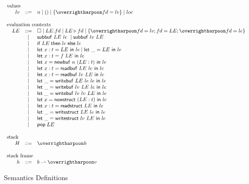\clearpage

\begin{figure}[!htbp]
  $$\begin{array}{rrcl}

    \multicolumn{4}{l}{\textrm{values}} \\
    & lv & ::= & n \mid () \mid \{\ls{fd=lv}\} \mid loc \\
    \\
    \multicolumn{4}{l}{\textrm{evaluation contexts}} \\
    & LE & ::= & \symhole \mid LE.fd \mid \estructfield{LE}{fd} \mid \{\ls{fd=lv};fd=LE;\ls{fd=le}\} \\
    & & \mid & \esubbuf{LE}{le} \mid \esubbuf{lv}{LE} \\
    & & \mid & \eif {LE}{le}{le} \\
    & & \mid & \elet{x:t}{LE}{le} \mid \elet{\_}{LE}{le} \\
    & & \mid & \elet{x:t}{f\;LE}{le} \\
    & & \mid & \elet{x}{\enewbuf{n}{(LE:t)}}{le} \\
    & & \mid & \elet{x:t}{\ereadbuf{LE}{le}}{le} \\
    & & \mid & \elet{x:t}{\ereadbuf{lv}{LE}}{le} \\
    & & \mid & \elet{\_}{\ewritebuf{LE}{le}{le}}{le} \\
    & & \mid & \elet{\_}{\ewritebuf{lv}{LE}{le}}{le} \\
    & & \mid & \elet{\_}{\ewritebuf{lv}{lv}{LE}}{le} \\
    & & \mid & \elet{x}{\enewstruct{(LE:t)}}{le} \\
    & & \mid & \elet{x:t}{\ereadstruct{LE}}{le} \\
    & & \mid & \elet{\_}{\ewritestruct{LE}{le}}{le} \\
    & & \mid & \elet{\_}{\ewritestruct{lv}{LE}}{le} \\
    & & \mid & \epop\;LE \\
    \\
    \multicolumn{4}{l}{\textrm{stack}} \\
    & H & ::= & \ls{h} \\
    \\
    \multicolumn{4}{l}{\textrm{stack frame}} \\
    & h & ::= & b\sympartial \ls{v} \\

\end{array}$$
\caption{\lamstar Semantics Definitions}
\label{fig:lowstar-semantics-defs}
\end{figure}

